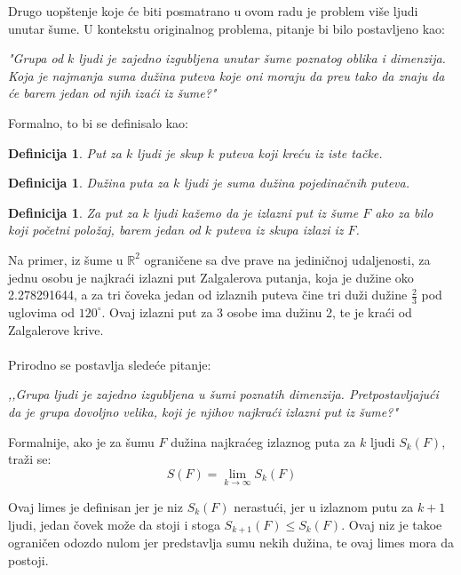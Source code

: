 \documentclass[11pt,letter]{article}
\newtheorem{df}[teo]{\bf Definicija}
\begin{document}
\indent Drugo uop\v stenje koje \' ce biti posmatrano u ovom radu je problem vi\v se ljudi unutar \v sume. U kontekstu originalnog problema, pitanje bi bilo postavljeno kao:
\begin{center}
\textit{"Grupa od $k$ ljudi je zajedno izgubljena unutar \v sume poznatog oblika i dimenzija. Koja je najmanja suma du\v zina puteva koje oni moraju da pre\dj u tako da znaju da \' ce barem jedan od njih iza\' ci iz \v sume?"}
\end{center}
\newpage
Formalno, to bi se definisalo kao:
\begin{df} Put za $k$ ljudi je skup $k$ puteva koji kre\' cu iz iste ta\v cke. \end{df}
\begin{df} Du\v zina puta za $k$ ljudi je suma du\v zina pojedina\v cnih puteva.\end{df}
\begin{df} Za put za $k$ ljudi ka\v zemo da je izlazni put iz \v sume $F$ ako za bilo koji po\v cetni polo\v zaj, barem jedan od $k$ puteva iz skupa izlazi iz $F$.\end{df}
\smallskip

\indent Na primer, iz \v sume u $\mathbb{R}^2$ ograni\v cene sa dve prave na jedini\v cnoj udaljenosti, za jednu osobu je najkra\' ci izlazni put Zalgalerova putanja, koja je du\v zine oko 2.278291644, a za tri \v coveka jedan od izlaznih puteva \v cine tri du\v zi du\v zine $\frac{2}{3}$ pod uglovima od $120^\circ$. Ovaj izlazni put za 3 osobe ima du\v zinu 2, te je kra\' ci od Zalgalerove krive.
\\
\smallskip
\\
\indent Prirodno se postavlja slede\' ce pitanje:
\begin{center}
\textit{,,Grupa ljudi je zajedno izgubljena u \v sumi poznatih dimenzija. Pretpostavljaju\' ci da je grupa dovoljno velika, koji je njihov najkra\' ci izlazni put iz \v sume?"}
\end{center}
Formalnije, ako je za \v sumu $F$ du\v zina najkra\' ceg izlaznog puta za $k$ ljudi $S_k(F)$, tra\v zi se:
$$S(F)=\lim_{k \to \infty} S_k(F)$$

\indent Ovaj limes je definisan jer je niz $S_k(F)$ nerastu\' ci, jer u izlaznom putu za $k+1$ ljudi, jedan \v covek mo\v ze da stoji i stoga $S_{k+1}(F)\leqslant S_{k}(F)$. Ovaj niz je tako\dj e ograni\v cen odozdo nulom jer predstavlja sumu nekih du\v zina, te ovaj limes mora da postoji. 
\\
\end{document}
